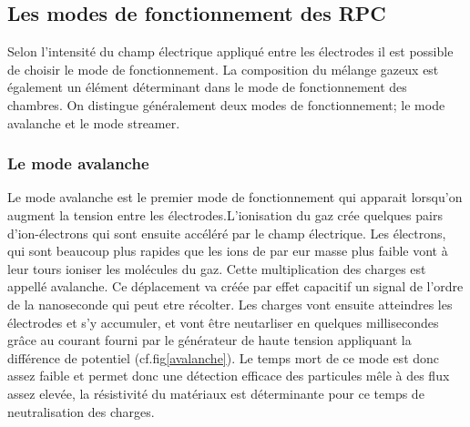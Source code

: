 \subsection{Les modes de fonctionnement des RPC}
Selon l'intensité du champ électrique appliqué  entre les électrodes il est possible de choisir le mode de fonctionnement. La composition du mélange gazeux est également un élément déterminant dans le mode de fonctionnement des chambres. On distingue généralement deux modes de fonctionnement; le mode avalanche et le mode streamer.

\subsubsection{Le mode avalanche}
Le mode avalanche est le premier mode de fonctionnement qui apparait lorsqu'on augment la tension entre les électrodes.L'ionisation du gaz crée quelques pairs d'ion-électrons qui sont ensuite accéléré par le champ électrique. Les électrons, qui sont beaucoup plus rapides que les ions de par eur masse plus faible vont à leur tours ioniser les molécules du gaz. Cette multiplication des charges est appellé avalanche. Ce déplacement va créée par effet capacitif un signal de l'ordre de la nanoseconde qui peut etre récolter. Les charges vont ensuite atteindres les électrodes et s'y accumuler, et vont être neutarliser en quelques millisecondes grâce au courant fourni par le générateur de haute tension appliquant la différence de potentiel (cf.fig\ref{avalanche}). Le temps mort de ce mode est donc assez faible et permet donc une détection efficace des particules mêle à des flux assez elevée, la résistivité du matériaux est déterminante pour ce temps de neutralisation des charges.


